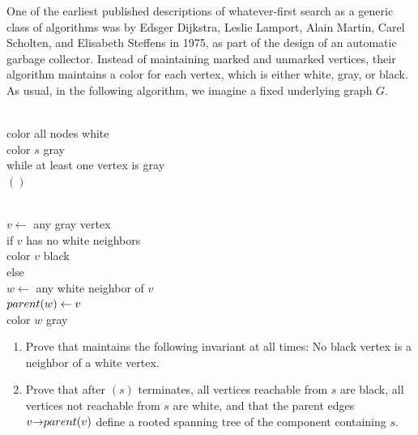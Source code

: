 \begin{exercises}
\item One of the earliest published descriptions of whatever-first search as a generic class of algorithms was by Edsger Dijkstra, Leslie Lamport, Alain Martin, Carel Scholten, and Elisabeth Steffens in 1975, as part of the design of an automatic garbage collector.
Instead of maintaining marked and unmarked vertices, their algorithm maintains a color for each vertex, which is either white, gray, or black.
As usual, in the following algorithm, we imagine a fixed underlying graph $G$.
\begin{center}
\begin{minipage}[c]{0.47\linewidth}
\begin{pseudocode}
\\
color all nodes white\\
color $s$ gray\\
while at least one vertex is gray\\
\Indent {}$()$
\end{pseudocode}
\end{minipage}\hfill
\begin{minipage}[c]{0.51\linewidth}
\begin{pseudocode}
\\
$v \gets$ any gray vertex\\
if $v$ has no white neighbors\\
\Indent color $v$ black\\
else\\
\Indent $w \gets$ any white neighbor of $v$\\
\Indent $parent(w) \gets v$\\
\Indent color $w$ gray
\end{pseudocode}
\end{minipage}
\end{center}
\begin{enumerate}
\item Prove that  maintains the following invariant at all times: No black vertex is a neighbor of a white vertex.
\item Prove that after $(s)$ terminates, all vertices reachable from $s$ are black, all vertices not reachable from $s$ are white, and that the parent edges $v\mathord{\rightarrow}parent(v)$ define a rooted spanning tree of the component containing $s$.


\end{enumerate}
\end{exercises}
